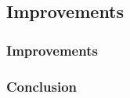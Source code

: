 \documentclass{beamer}
\begin{document}
\subsection{Improvements}
\begin{frame}

\frametitle{Improvements}





\end{frame}

\begin{frame}

\frametitle{Conclusion}





\end{frame}
\end{document}
